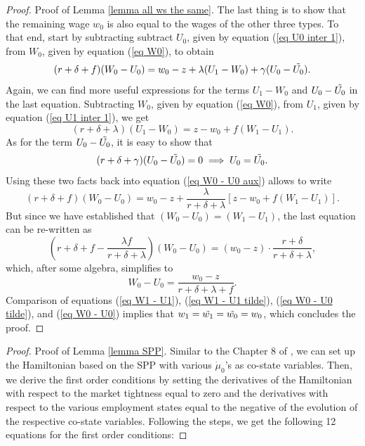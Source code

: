 \documentclass[12pt]{article} %
\theoremstyle{definition}
\begin{document}
\begin{appendix}
\begin{proof}{Proof of Lemma \ref{lemma all ws the same}.}
The last thing is to show that the remaining wage $w_0$ is also equal to the wages of the other three types. To that end, start by subtracting subtract ${U_0}$, given by equation (\ref{eq U0 inter 1}), from ${W_0}$, given by equation (\ref{eq W0}), to obtain 
\begin{equation}
(r+\delta+f)(W_0-U_0)=w_0-z+\lambda(U_1-W_0)+\gamma(U_0-\Tilde{U_0}).\label{eq W0 - U0 aux} 
\end{equation}Again, we can find more useful expressions for the terms $U_1-W_0$ and $U_0-\Tilde{U_0}$ in the last equation. Subtracting $W_0$, given by equation (\ref{eq W0}), from $U_1$, given by equation (\ref{eq U1 inter 1}), we get 
\begin{equation*}
   (r+\delta+\lambda)(U_1-W_0)=z-w_0+f(W_1-U_1).
  \end{equation*}
As for the term $U_0-\Tilde{U_0}$, it is easy to show that 
\begin{equation*} 
(r+\delta+\gamma)(U_0-\Tilde{U_0})=0 \implies U_0=\Tilde{U_0}. 
\end{equation*}Using these two facts back into equation (\ref{eq W0 - U0 aux}) allows to write  
\begin{equation}
(r+\delta+f)(W_0-U_0)=w_0-z+\frac{\lambda}{r+\delta+\lambda}[z-w_0+f(W_1-U_1)].\nonumber 
\end{equation}But since we have established that $(W_0-U_0)=(W_1-U_1)$, the last equation can be re-written as \begin{equation*}
   \left(r+\delta+f-\frac{\lambda f}{r+\delta+\lambda}\right)(W_0-U_0)=(w_0-z)\cdot \frac{r+\delta}{r+\delta+\lambda},  
   \end{equation*}which, after some algebra, simplifies to  
\begin{equation}
      W_0-U_0 = \frac{w_0-z}{r+\delta+\lambda+f}.\label{eq W0 - U0}  
\end{equation}Comparison of equations (\ref{eq W1 - U1}), (\ref{eq W1 - U1 tilde}), (\ref{eq W0 - U0 tilde}), and (\ref{eq W0 - U0}) implies that $w_1=\tilde{w_1}=\Tilde{w_0}=w_0$, which concludes the proof.\end{proof} 



\iffalse


\begin{proof}{Proof of Lemma \ref{lemma SPP}.}
Similar to the Chapter 8 of \cite{pissarides2000equilibrium}, we can set up the Hamiltonian based on the SPP with various $\dot{\mu}_0$'s as co-state variables. Then, we derive the first order conditions by setting the derivatives of the Hamiltonian with respect to the market tightness equal to zero and the derivatives with respect to the various employment states equal to the negative of the evolution of the respective co-state variables. Following the steps, we get the following 12 equations for the first order conditions:


\end{proof}
\end{appendix}
\end{document}
